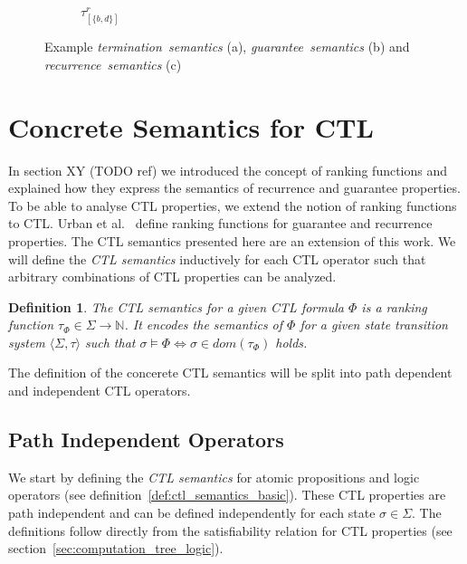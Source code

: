 \documentclass[11pt,a4paper,titlepage]{article}
\newtheorem{definition}{Definition}[section]
\begin{document}
\begin{figure}
\begin{subfigure}[b]{0.32\textwidth}
        \caption{$\tau_{[\{b, d\}]}^{r}$}
    \end{subfigure}
    \caption{
        Example \textit{termination\ semantics} (a), 
        \textit{guarantee\ semantics} (b) and
        \textit{recurrence\ semantics} (c)
    } 
    \label{fig:ranking_functios_example}
\end{figure}

\section{Concrete Semantics for CTL}\label{sec:ctl_semantics}
In section XY (TODO ref) we introduced the concept of ranking functions and explained how they express the semantics of 
recurrence and guarantee properties. To be able to analyse CTL properties, we extend the notion of ranking functions to CTL. 
Urban et al.~\cite{UrbanM-VMCAI15} define ranking functions for guarantee and recurrence properties.
The CTL semantics presented here are an extension of this work. We will define the \textit{CTL semantics} inductively 
for each CTL operator such that arbitrary combinations of CTL properties can be analyzed. 

\begin{definition}
    The \textit{CTL semantics} for a given CTL formula $\Phi$ is a ranking function 
    $\tau_{\Phi} \in \Sigma \rightarrow \mathbb{N}$. 
    It encodes the semantics of $\Phi$ for a given state transition 
    system $\langle \Sigma, \tau \rangle$ such that $\sigma \models \Phi \iff \sigma \in dom(\tau_{\Phi})$ holds. 
\end{definition}

The definition of the concerete CTL semantics will be split into path dependent and independent CTL operators. 

\subsection{Path Independent Operators}

We start by defining the \textit{CTL semantics} for atomic propositions and logic operators (see definition~\ref{def:ctl_semantics_basic}). 
These CTL properties are path independent and can be defined independently for each state $\sigma \in \Sigma$.
The definitions follow directly from the satisfiability relation for CTL properties (see section~\ref{sec:computation_tree_logic}). 
\end{document}
